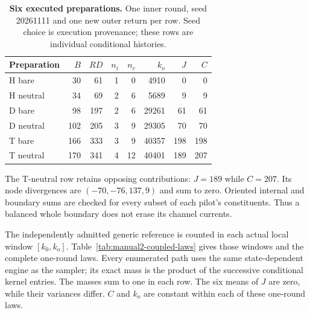 \begin{table}[htbp]
\centering\small
\begin{tabular}{@{}lrrrrrrr@{}}
\toprule
Preparation & $B$ & $RD$ & $n_i$ & $n_c$ & $k_o$ & $J$ & $C$\\
\midrule
H bare    & 30  & 61  & 1 & 0  & 4910  & 0   & 0\\
H neutral & 34  & 69  & 2 & 6  & 5689  & 9   & 9\\
D bare    & 98  & 197 & 2 & 6  & 29261 & 61  & 61\\
D neutral & 102 & 205 & 3 & 9  & 29305 & 70  & 70\\
T bare    & 166 & 333 & 3 & 9  & 40357 & 198 & 198\\
T neutral & 170 & 341 & 4 & 12 & 40401 & 189 & 207\\
\bottomrule
\end{tabular}
\caption{\textbf{Six executed preparations.} One inner round, seed 20261111
and one new outer return per row. Seed choice is execution provenance;
these rows are individual conditional histories.}
\label{tab:manual2-coupled-pilots}
\end{table}

The T-neutral row retains opposing contributions: $J=189$ while $C=207$.
Its node divergences are $(-70,-76,137,9)$ and sum to zero. Oriented internal
and boundary sums are checked for every subset of each pilot's constituents.
Thus a balanced whole boundary does not erase its channel currents.

The independently admitted generic reference is counted in each actual local
window $[k_0,k_o]$. Table~\ref{tab:manual2-coupled-laws} gives those windows
and the complete one-round laws. Every enumerated path uses the same
state-dependent engine as the sampler; its exact mass is the product of the
successive conditional kernel entries. The masses sum to one in each row.
The six means of $J$ are zero, while their variances differ. $C$ and $k_o$ are
constant within each of these one-round laws.

